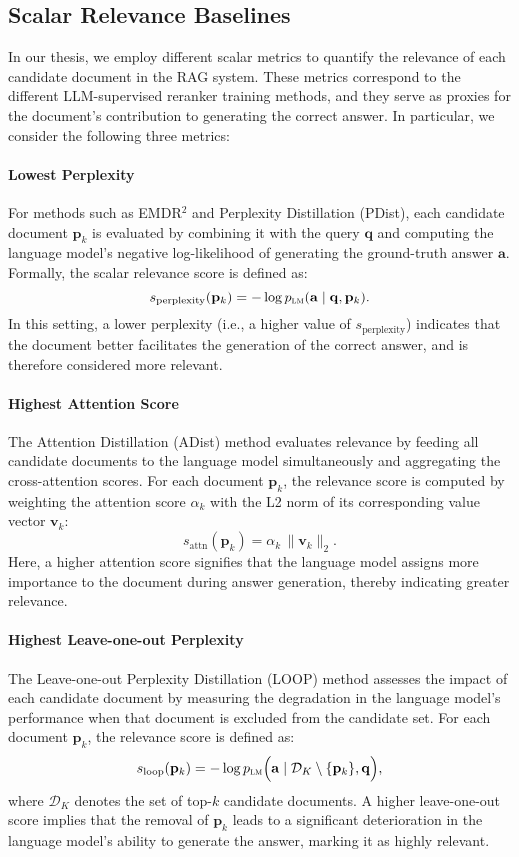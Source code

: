 \subsection{Scalar Relevance Baselines}
In our thesis, we employ different scalar metrics to quantify the relevance of each candidate document in the RAG system. These metrics correspond to the different LLM-supervised reranker training methods, and they serve as proxies for the document's contribution to generating the correct answer. In particular, we consider the following three metrics:

\paragraph{Lowest Perplexity}
For methods such as EMDR$^2$ and Perplexity Distillation (PDist), each candidate document $\mathbf{p}_k$ is evaluated by combining it with the query $\mathbf{q}$ and computing the language model’s negative log-likelihood of generating the ground-truth answer $\mathbf{a}$. Formally, the scalar relevance score is defined as:
\[
s_{\text{perplexity}}(\mathbf{p}_k) = -\log p_{\textsc{lm}}(\mathbf{a} \mid \mathbf{q}, \mathbf{p}_k).
\]
In this setting, a lower perplexity (i.e., a higher value of $s_{\text{perplexity}}$) indicates that the document better facilitates the generation of the correct answer, and is therefore considered more relevant.

\paragraph{Highest Attention Score}
The Attention Distillation (ADist) method evaluates relevance by feeding all candidate documents to the language model simultaneously and aggregating the cross-attention scores. For each document $\mathbf{p}_k$, the relevance score is computed by weighting the attention score $\alpha_k$ with the L2 norm of its corresponding value vector $\mathbf{v}_k$:
\[
s_{\text{attn}}(\mathbf{p}_k) = \alpha_k \,\|\mathbf{v}_k\|_2.
\]
Here, a higher attention score signifies that the language model assigns more importance to the document during answer generation, thereby indicating greater relevance.

\paragraph{Highest Leave-one-out Perplexity}
The Leave-one-out Perplexity Distillation (LOOP) method assesses the impact of each candidate document by measuring the degradation in the language model’s performance when that document is excluded from the candidate set. For each document $\mathbf{p}_k$, the relevance score is defined as:
\[
s_{\text{loop}}(\mathbf{p}_k) = -\log p_{\textsc{lm}}\Big(\mathbf{a} \mid \mathcal{D}_K \setminus \{\mathbf{p}_k\}, \mathbf{q}\Big),
\]
where $\mathcal{D}_K$ denotes the set of top-$k$ candidate documents. A higher leave-one-out score implies that the removal of $\mathbf{p}_k$ leads to a significant deterioration in the language model’s ability to generate the answer, marking it as highly relevant.

